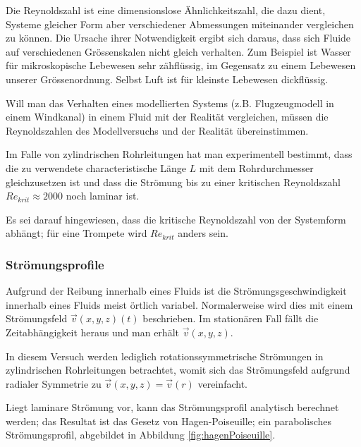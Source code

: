 Die Reynoldszahl  ist eine dimensionslose \"Ahnlichkeitszahl,  die dazu dient,
Systeme gleicher  Form aber verschiedener Abmessungen  miteinander vergleichen
zu k\"onnen. Die  Ursache ihrer  Notwendigkeit ergibt  sich daraus,  dass sich
Fluide auf verschiedenen Gr\"ossenskalen  nicht gleich verhalten. Zum Beispiel
ist Wasser f\"ur mikroskopische Lebewesen sehr z\"ahfl\"ussig, im Gegensatz zu
einem  Lebewesen  unserer  Gr\"ossenordnung. Selbst Luft  ist  f\"ur  kleinste
Lebewesen dickfl\"ussig.

Will  man das  Verhalten  eines modellierten  Systems (z.B. Flugzeugmodell  in
einem Windkanal) in  einem Fluid mit der Realit\"at  vergleichen, m\"ussen die
Reynoldszahlen des Modellversuchs und der Realit\"at \"ubereinstimmen.

Im Falle von zylindrischen Rohrleitungen  hat man experimentell bestimmt, dass
die  zu  verwendete  characteristische  L\"ange $L$  mit  dem  Rohrdurchmesser
gleichzusetzen  ist   und  dass  die   Str\"omung  bis  zu   einer  kritischen
Reynoldszahl $\mathit{Re}_{krit} \approx 2000$ noch laminar ist.

Es sei darauf hingewiesen, dass  die kritische Reynoldszahl von der Systemform
abh\"angt; f\"ur eine Trompete wird $\mathit{Re}_{krit}$ anders sein.


\subsubsection{Str\"omungsprofile}
\label{subsubsec:stromungsprofile}

Aufgrund der Reibung innerhalb eines Fluids ist die Str\"omungsgeschwindigkeit
innerhalb eines  Fluids meist \"ortlich variabel. Normalerweise  wird dies mit
einem Str\"omungsfeld  $\vec{v}(x,y,z)(t)$ beschrieben. Im  station\"aren Fall
f\"allt die Zeitabh\"angigkeit heraus und man erh\"alt $\vec{v}(x,y,z)$.

In  diesem  Versuch  werden lediglich  rotationssymmetrische  Str\"omungen  in
zylindrischen  Rohrleitungen   betrachtet,  womit  sich   das  Str\"omungsfeld
aufgrund radialer Symmetrie zu $\vec{v}(x,y,z) = \vec{v}(r)$ vereinfacht.

Liegt laminare Str\"omung vor, kann das Str\"omungsprofil analytisch berechnet
werden; das  Resultat ist das  Gesetz von Hagen-Poiseuille;  ein parabolisches
Str\"omungsprofil, abgebildet in Abbildung \ref{fig:hagenPoiseuille}.

